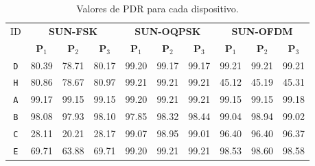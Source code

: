 \begin{table}[ht]
      \centering
      \caption{Valores de PDR para cada dispositivo.}
      \begin{tabular}{|c|c|c|c|c|c|c|c|c|c|}
            \hline
            ID                     & \multicolumn{3}{c|}{\textbf{SUN-FSK}} & \multicolumn{3}{c|}{\textbf{SUN-OQPSK}} & \multicolumn{3}{c|}{\textbf{SUN-OFDM}}                                                                                                       \\ \cline{2-10}
                                   & \textbf{P$_1$}                        & \textbf{P$_2$}                          & \textbf{P$_3$}                         & \textbf{P$_1$} & \textbf{P$_2$} & \textbf{P$_3$} & \textbf{P$_1$} & \textbf{P$_2$} & \textbf{P$_3$} \\ \hline
            \texttt{D}             & 80.39                                 & 78.71                                   & 80.17                                  & 99.20          & 99.17          & 99.17          & 99.21          & 99.21          & 99.21          \\ \hline
            \texttt{H}             & 80.86                                 & 78.67                                   & 80.97                                  & 99.21          & 99.21          & 99.21          & 45.12          & 45.19          & 45.31          \\ \hline
            \texttt{A}             & 99.17                                 & 99.15                                   & 99.15                                  & 99.20          & 99.21          & 99.21          & 99.15          & 99.15          & 99.18          \\ \hline
            \texttt{B}             & 98.08                                 & 97.93                                   & 98.10                                  & 97.85          & 98.32          & 98.44          & 99.04          & 98.94          & 99.02          \\ \hline
            \texttt{C}             & 28.11                                 & 20.21                                   & 28.17                                  & 99.07          & 98.95          & 99.01          & 96.40          & 96.40          & 96.37          \\ \hline
            \texttt{E}             & 69.71                                 & 63.88                                   & 69.71                                  & 99.20          & 99.21          & 99.21          & 98.53          & 98.60          & 98.58          \\ \hline

\end{tabular}
\end{table}
